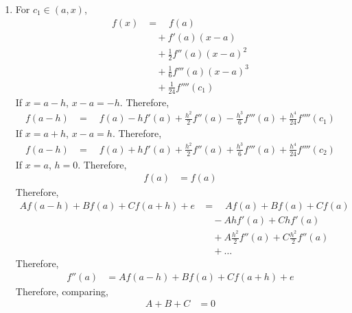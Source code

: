 \documentclass[fleqn, a4paper, 12pt, twoside]{article}
\theoremstyle{definition}
\theoremstyle{theorem}
\begin{document}
\begin{solution}
	\begin{enumerate}[leftmargin=*]
		\item
			For $c_1 \in (a,x)$,
			\begin{align*}
				f(x) & = \quad f(a)                          \\
                                     & \quad + f'(a) (x - a)                 \\
                                     & \quad + \frac{1}{2} f''(a) (x - a)^2  \\
                                     & \quad + \frac{1}{6} f'''(a) (x - a)^3 \\
                                     & \quad + \frac{1}{24} f''''(c_1)
			\end{align*}
			If $x = a - h$, $x - a = -h$.
			Therefore,
			\begin{align*}
				f(a - h) & = \quad f(a) - h f'(a) + \frac{h^2}{2} f''(a) - \frac{h^3}{6} f'''(a) + \frac{h^4}{24} f''''(c_1)
			\end{align*}
			If $x = a + h$, $x - a = h$.
			Therefore,
			\begin{align*}
				f(a - h) & = \quad f(a) + h f'(a) + \frac{h^2}{2} f''(a) + \frac{h^3}{6} f'''(a) + \frac{h^4}{24} f''''(c_2)
			\end{align*}
			If $x = a$, $h = 0$.
			Therefore,
			\begin{align*}
				f(a) & = f(a)
			\end{align*}
			Therefore,
			\begin{align*}
				A f(a - h) + B f(a) + C f(a + h) + e & = \quad A f(a) + B f(a) + C f(a)                        \\
                                                                     & \quad - A h f'(a) + C h f'(a)                           \\
                                                                     & \quad + A \frac{h^2}{2} f''(a) + C \frac{h^2}{2} f''(a) \\
                                                                     & \quad + \dots
			\end{align*}
			Therefore,
			\begin{align*}
				f''(a) & = A f(a - h) + B f(a) + C f(a + h) + e
			\end{align*}
			Therefore, comparing,
			\begin{align*}
				A + B + C                         & = 0 \\

\end{align*}
\end{enumerate}
\end{solution}
\end{document}
